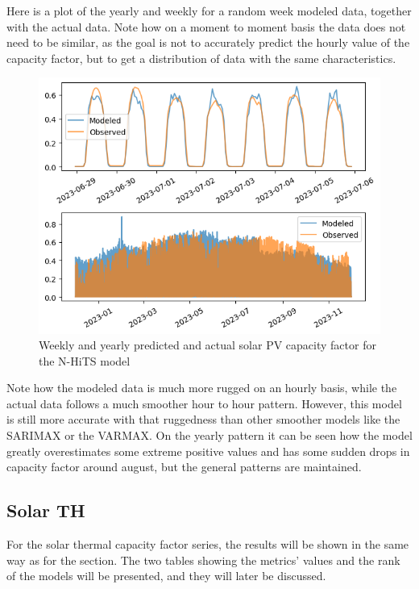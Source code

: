 Here is a plot of the yearly and weekly for a random week modeled data, together with the actual data. Note how on a moment to moment basis the data does not need to be similar, as the goal is not to accurately predict the hourly value of the capacity factor, but to get a distribution of data with the same characteristics. 
\begin{figure}[ht]
    \centering
    \captionsetup{justification=centering}
    \includegraphics[width=0.7\linewidth]{assets/nhits-solar-pv.png}
    \caption{Weekly and yearly predicted and actual solar PV capacity factor for the N-HiTS model}
    \label{fig:nhits-solar-pv}
\end{figure}
Note how the modeled data is much more rugged on an hourly basis, while the actual data follows a much smoother hour to hour pattern. However, this model is still more accurate with that ruggedness than other smoother models like the SARIMAX or the VARMAX.  
On the yearly pattern it can be seen how the model greatly overestimates some extreme positive values and has some sudden drops in capacity factor around august, but the general patterns are maintained. 
\subsection{Solar TH}
For the solar thermal capacity factor series, the results will be shown in the same way as for the  section. The two tables showing the metrics' values and the rank of the models will be presented, and they will later be discussed. 

